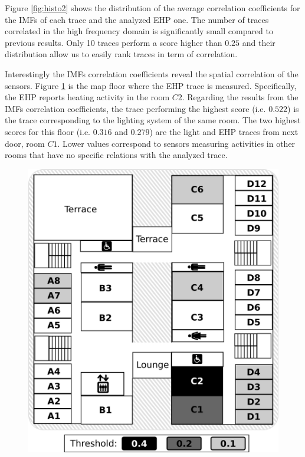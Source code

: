 Figure \ref{fig:histo2} shows the distribution of the average correlation coefficients for the IMFs of each trace and the analyzed EHP one.
The number of traces correlated in the high frequency domain is significantly small compared to previous results. 
Only 10 traces perform a score higher than $0.25$ and their distribution allow us to easily rank traces in term of correlation.

Interestingly the IMFs correlation coefficients reveal the spatial correlation of the sensors.
Figure \ref{fig:map} is the map floor where the EHP trace is measured.
Specifically, the EHP reports heating activity in the room $C2$.
Regarding the results from the IMFs correlation coefficients, the trace performing the highest score (i.e. $0.522$) is the trace corresponding to the lighting system of the same room.
The two highest scores for this floor (i.e. $0.316$ and $0.279$) are the light and EHP traces from next door, room $C1$.
Lower values correspond to sensors measuring activities in other rooms that have no specific relations with the analyzed trace.

\begin{figure}
\includegraphics[width=.5\textwidth]{img/floorMap.png}
\caption{}
\label{fig:map}
\end{figure}
